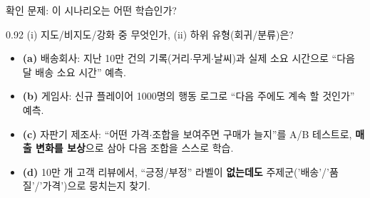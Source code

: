 \begin{frame}{확인 문제: 이 시나리오는 어떤 학습인가?}
\begin{center}\begin{varwidth}{0.92\textwidth}
  (i) 지도/비지도/강화 중 무엇인가, (ii) 하위 유형(회귀/분류)은?
  \small
  \begin{itemize}
    \item \textbf{(a)} 배송회사: 지난 10만 건의 기록(거리$\cdot$무게$\cdot$날씨)과
      실제 소요 시간으로 ``다음 달 배송 소요 시간'' 예측.
    \item \textbf{(b)} 게임사: 신규 플레이어 1000명의 행동 로그로
      ``다음 주에도 계속 할 것인가'' 예측.
    \item \textbf{(c)} 자판기 제조사: ``어떤 가격$\cdot$조합을 보여주면
      구매가 늘지''를 A/B 테스트로, \textbf{매출 변화를 보상}으로 삼아
      다음 조합을 스스로 학습.
    \item \textbf{(d)} 10만 개 고객 리뷰에서, ``긍정/부정'' 라벨이
      \textbf{없는데도} 주제군('배송'/'품질'/'가격')으로 뭉치는지 찾기.
  \end{itemize}
\end{varwidth}\end{center}
\end{frame}
